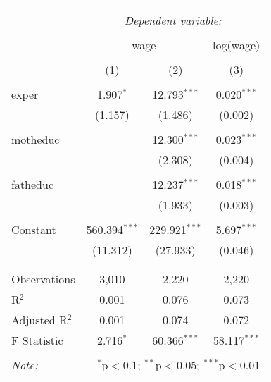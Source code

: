 
\begin{table}[!htbp] \centering 
  \caption{} 
  \label{} 
\begin{tabular}{@{\extracolsep{5pt}}lccc} 
\\[-1.8ex]\hline 
\hline \\[-1.8ex] 
 & \multicolumn{3}{c}{\textit{Dependent variable:}} \\ 
\cline{2-4} 
\\[-1.8ex] & \multicolumn{2}{c}{wage} & log(wage) \\ 
\\[-1.8ex] & (1) & (2) & (3)\\ 
\hline \\[-1.8ex] 
 exper & 1.907$^{*}$ & 12.793$^{***}$ & 0.020$^{***}$ \\ 
  & (1.157) & (1.486) & (0.002) \\ 
  & & & \\ 
 motheduc &  & 12.300$^{***}$ & 0.023$^{***}$ \\ 
  &  & (2.308) & (0.004) \\ 
  & & & \\ 
 fatheduc &  & 12.237$^{***}$ & 0.018$^{***}$ \\ 
  &  & (1.933) & (0.003) \\ 
  & & & \\ 
 Constant & 560.394$^{***}$ & 229.921$^{***}$ & 5.697$^{***}$ \\ 
  & (11.312) & (27.933) & (0.046) \\ 
  & & & \\ 
\hline \\[-1.8ex] 
Observations & 3,010 & 2,220 & 2,220 \\ 
R$^{2}$ & 0.001 & 0.076 & 0.073 \\ 
Adjusted R$^{2}$ & 0.001 & 0.074 & 0.072 \\ 
F Statistic & 2.716$^{*}$ & 60.366$^{***}$ & 58.117$^{***}$ \\ 
\hline 
\hline \\[-1.8ex] 
\textit{Note:}  & \multicolumn{3}{r}{$^{*}$p$<$0.1; $^{**}$p$<$0.05; $^{***}$p$<$0.01} \\ 
\end{tabular} 
\end{table} 
